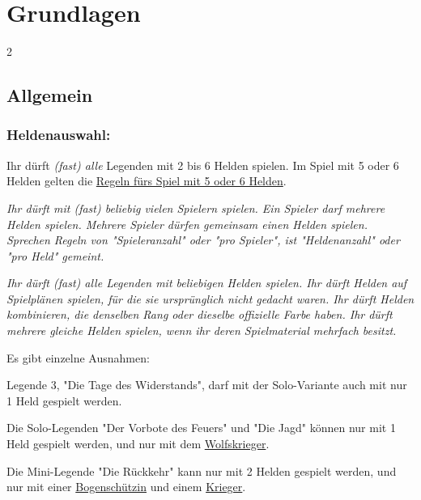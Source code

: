 \documentclass[10pt, a4paper, oneside]{book}
\newcommand{\fan}[1]{\textit{#1}}
\begin{document}
\chapter{Grundlagen}
\label{Grundlagen}


\begin{multicols*}{2}\raggedcolumns




\begin{nobgcolor}

\section{Allgemein}





\subsection{Heldenauswahl:}

Ihr dürft \fan{(fast) alle} Legenden mit 2 bis 6 Helden spielen. Im Spiel mit 5 oder 6 Helden gelten die \hyperref[5 oder 6 Helden]{Regeln fürs Spiel mit 5 oder 6 Helden}.

\fan{Ihr dürft mit (fast) beliebig vielen Spielern spielen. Ein Spieler darf mehrere Helden spielen. Mehrere Spieler dürfen gemeinsam einen Helden spielen. Sprechen Regeln von "Spieleranzahl" oder "pro Spieler", ist "Heldenanzahl" oder "pro Held" gemeint.}

\fan{Ihr dürft (fast) alle Legenden mit beliebigen Helden spielen. Ihr dürft Helden auf Spielplänen spielen, für die sie ursprünglich nicht gedacht waren. Ihr dürft Helden kombinieren, die denselben Rang oder dieselbe offizielle Farbe haben. Ihr dürft mehrere gleiche Helden spielen, wenn ihr deren Spielmaterial mehrfach besitzt.}



Es gibt einzelne Ausnahmen:

\bullet{} Legende 3, "Die Tage des Widerstands", darf mit der Solo-Variante auch mit nur 1 Held gespielt werden.

\bullet{} Die Solo-Legenden "Der Vorbote des Feuers" und "Die Jagd" können nur mit 1 Held gespielt werden, und nur mit dem \hyperref[Wolfskrieger]{Wolfskrieger}.

\bullet{} Die Mini-Legende "Die Rückkehr" kann nur mit 2 Helden gespielt werden, und nur mit einer \hyperref[Bogenschützin]{Bogenschützin} und einem \hyperref[Krieger]{Krieger}.


\end{nobgcolor}
\end{multicols*}
\end{document}

